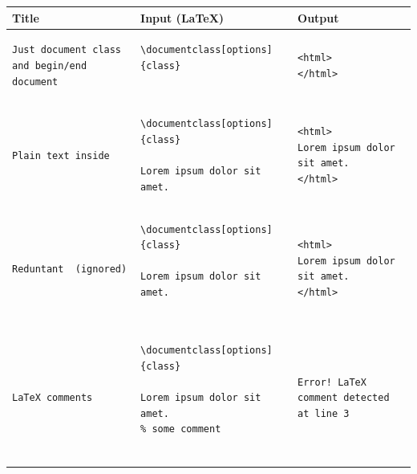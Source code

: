 \begin{tabular}{|p{3cm}|p{6cm}|p{6cm}|}
\hline 
Title  &  Input (\LaTeX) & Output \\
\hline

\begin{lstlisting}
Just document class and begin/end document
\end{lstlisting}&
\begin{lstlisting}
\documentclass[options]{class}


\end{lstlisting}&
\begin{lstlisting}
<html>
</html>
\end{lstlisting}  \\
\hline 

\begin{lstlisting}
Plain text inside
\end{lstlisting}&
\begin{lstlisting}
\documentclass[options]{class}

Lorem ipsum dolor sit amet.

\end{lstlisting}&
\begin{lstlisting}
<html>
Lorem ipsum dolor sit amet.
</html>
\end{lstlisting}  \\
\hline 

\begin{lstlisting}
Reduntant  (ignored)
\end{lstlisting}&
\begin{lstlisting}
\documentclass[options]{class}

Lorem ipsum dolor sit amet.


\end{lstlisting}&
\begin{lstlisting}
<html>
Lorem ipsum dolor sit amet.
</html>
\end{lstlisting}  \\
\hline 

\begin{lstlisting}
LaTeX comments
\end{lstlisting}&
\begin{lstlisting}
\documentclass[options]{class}

Lorem ipsum dolor sit amet.
% some comment


\end{lstlisting}&
\begin{lstlisting}
Error! LaTeX comment detected at line 3
\end{lstlisting}  \\
\hline 



\end{tabular}

